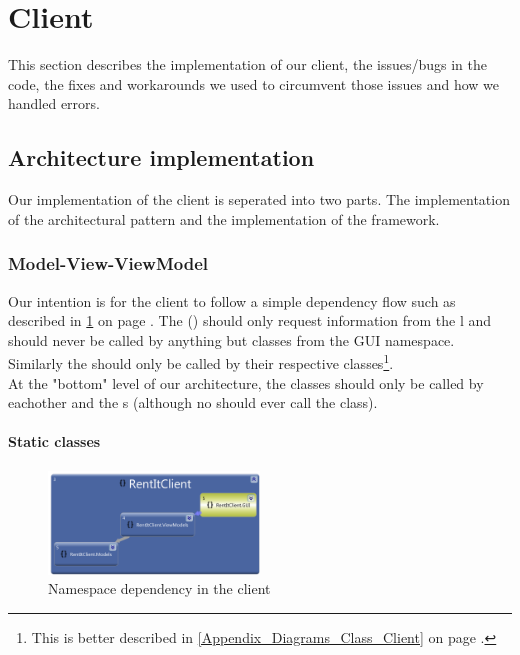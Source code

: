 \section{Client}
\label{Implementation_Client}
This section describes the implementation of our client, the issues/bugs in the code, the fixes and workarounds we used to circumvent those issues and how we handled errors.
\subsection{Architecture implementation}
\label{Implementation_Client_Architecture}
Our implementation of the client is seperated into two parts. The implementation of the  architectural pattern and the implementation of the  framework.
\subsubsection{Model-View-ViewModel}
\label{Implementation_Client_Architecture_MVVM}
Our intention is for the client to follow a simple dependency flow such as described in \ref{fig:Implementation_Client_Architecture_MVVM_Namespace} on page \pageref{fig:Implementation_Client_Architecture_MVVM_Namespace}. The  () should only request information from the l and should never be called by anything but classes from the GUI namespace. Similarly the  should only be called by their respective  classes\footnote{This is better described in \ref{Appendix_Diagrams_Class_Client} on page \pageref{Appendix_Diagrams_Class_Client}.}. 
\\At the "bottom" level of our architecture, the  classes should only be called by eachother and the s (although no  should ever call the  class). 

\paragraph{Static classes}
\begin{figure}[h!]
  \centering
    \includegraphics[width=0.5\textwidth]{Parts/Images/Implementation/NamespaceDependency}
  \caption{Namespace dependency in the client}
\label{fig:Implementation_Client_Architecture_MVVM_Namespace}
\end{figure}

